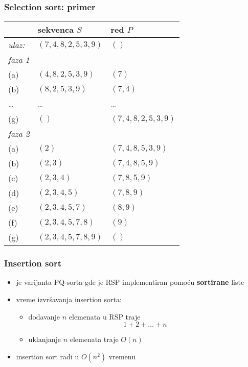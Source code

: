 \documentclass[compress]{beamer}
\begin{document}
\begin{frame}
  \frametitle{Selection sort: primer}
  \begin{center}
    \begin{tabular}{lll}
       & \textbf{sekvenca $S$} & \textbf{red $P$} \\ \hline\hline
      \textit{ulaz:} & $(7,4,8,2,5,3,9)$ & $()$ \\ \hline
      \textit{faza 1} &  & \\ 
      (a) & $(4,8,2,5,3,9)$ & $(7)$ \\ 
      (b) & $(8,2,5,3,9)$ & $(7,4)$ \\ 
      \ldots & \ldots & \ldots \\
      (g) & $()$ & $(7,4,8,2,5,3,9)$ \\ \hline
      \textit{faza 2} &  & \\ 
      (a) & $(2)$ & $(7,4,8,5,3,9)$ \\ 
      (b) & $(2,3)$ & $(7,4,8,5,9)$ \\ 
      (c) & $(2,3,4)$ & $(7,8,5,9)$ \\ 
      (d) & $(2,3,4,5)$ & $(7,8,9)$ \\ 
      (e) & $(2,3,4,5,7)$ & $(8,9)$ \\ 
      (f) & $(2,3,4,5,7,8)$ & $(9)$ \\ 
      (g) & $(2,3,4,5,7,8,9)$ & $()$
    \end{tabular}
  \end{center}
\end{frame}

\begin{frame}[fragile]
  \frametitle{Insertion sort}
  \begin{itemize}
    \item {} je varijanta PQ-sorta gde je RSP implementiran pomoću \textbf{sortirane} liste
    \item vreme izvršavanja insertion sorta:
    \begin{itemize}
      \item dodavanje $n$ elemenata u RSP traje \\
      $$1 + 2 + \ldots + n$$ 
      \item uklanjanje $n$ elemenata traje $O(n)$
    \end{itemize}
    \item insertion sort radi u $O(n^2)$ vremenu
  \end{itemize}
\end{frame}
\end{document}
